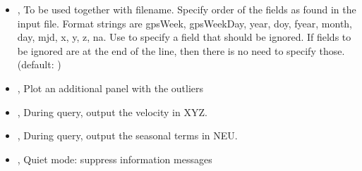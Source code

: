 \documentclass[letterpaper,10pt,english]{sphinxmanual}
\begin{document}
\begin{itemize}
\item {} 
\sphinxAtStartPar
{\hyperref[\detokenize{com:PlotETM.py--format}]{}} , {\hyperref[\detokenize{com:PlotETM.py---format}]{}}  \sphinxhyphen{} To be used together with \textendash{}filename. Specify order of the fields as found in the input file. Format strings are gpsWeek, gpsWeekDay, year, doy, fyear, month, day, mjd, x, y, z, na. Use  to specify a field that should be ignored. If fields to be ignored are at the end of the line, then there is no need to specify those. (default: )

\item {} 
\sphinxAtStartPar
{\hyperref[\detokenize{com:PlotETM.py--outliers}]{}}, {\hyperref[\detokenize{com:PlotETM.py---plot_outliers}]{}} \sphinxhyphen{} Plot an additional panel with the outliers

\item {} 
\sphinxAtStartPar
{\hyperref[\detokenize{com:PlotETM.py--vel}]{}}, {\hyperref[\detokenize{com:PlotETM.py---velocity}]{}} \sphinxhyphen{} During query, output the velocity in XYZ.

\item {} 
\sphinxAtStartPar
{\hyperref[\detokenize{com:PlotETM.py--seasonal}]{}}, {\hyperref[\detokenize{com:PlotETM.py---seasonal_terms}]{}} \sphinxhyphen{} During query, output the seasonal terms in NEU.

\item {} 
\sphinxAtStartPar
{\hyperref[\detokenize{com:PlotETM.py--quiet}]{}}, {\hyperref[\detokenize{com:PlotETM.py---suppress_messages}]{}} \sphinxhyphen{} Quiet mode: suppress information messages

\end{itemize}
\end{document}
